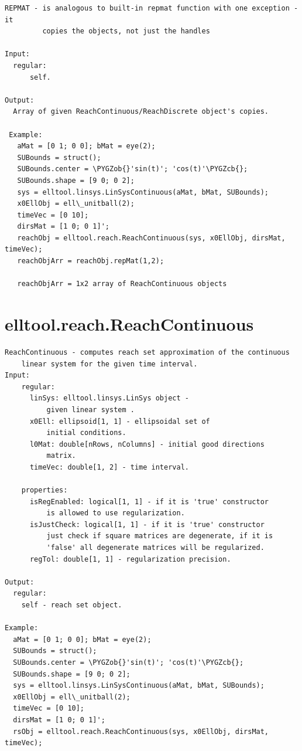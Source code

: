 \documentclass[letterpaper,10pt,english]{sphinxmanual}
\def\PYGZob{\char`\{}
\def\PYGZcb{\char`\}}
\begin{document}
\begin{Verbatim}[commandchars=\\\{\}]
REPMAT - is analogous to built-in repmat function with one exception - it
         copies the objects, not just the handles

Input:
  regular:
      self.

Output:
  Array of given ReachContinuous/ReachDiscrete object's copies.

 Example:
   aMat = [0 1; 0 0]; bMat = eye(2);
   SUBounds = struct();
   SUBounds.center = \PYGZob{}'sin(t)'; 'cos(t)'\PYGZcb{};
   SUBounds.shape = [9 0; 0 2];
   sys = elltool.linsys.LinSysContinuous(aMat, bMat, SUBounds);
   x0EllObj = ell\_unitball(2);
   timeVec = [0 10];
   dirsMat = [1 0; 0 1]';
   reachObj = elltool.reach.ReachContinuous(sys, x0EllObj, dirsMat, timeVec);
   reachObjArr = reachObj.repMat(1,2);

   reachObjArr = 1x2 array of ReachContinuous objects
\end{Verbatim}


\section{elltool.reach.ReachContinuous}
\label{chap_func:elltool-reach-reachcontinuous}
\begin{Verbatim}[commandchars=\\\{\}]
ReachContinuous - computes reach set approximation of the continuous
    linear system for the given time interval.
Input:
    regular:
      linSys: elltool.linsys.LinSys object -
          given linear system .
      x0Ell: ellipsoid[1, 1] - ellipsoidal set of
          initial conditions.
      l0Mat: double[nRows, nColumns] - initial good directions
          matrix.
      timeVec: double[1, 2] - time interval.

    properties:
      isRegEnabled: logical[1, 1] - if it is 'true' constructor
          is allowed to use regularization.
      isJustCheck: logical[1, 1] - if it is 'true' constructor
          just check if square matrices are degenerate, if it is
          'false' all degenerate matrices will be regularized.
      regTol: double[1, 1] - regularization precision.

Output:
  regular:
    self - reach set object.

Example:
  aMat = [0 1; 0 0]; bMat = eye(2);
  SUBounds = struct();
  SUBounds.center = \PYGZob{}'sin(t)'; 'cos(t)'\PYGZcb{};
  SUBounds.shape = [9 0; 0 2];
  sys = elltool.linsys.LinSysContinuous(aMat, bMat, SUBounds);
  x0EllObj = ell\_unitball(2);
  timeVec = [0 10];
  dirsMat = [1 0; 0 1]';
  rsObj = elltool.reach.ReachContinuous(sys, x0EllObj, dirsMat, timeVec);
\end{Verbatim}
\end{document}
